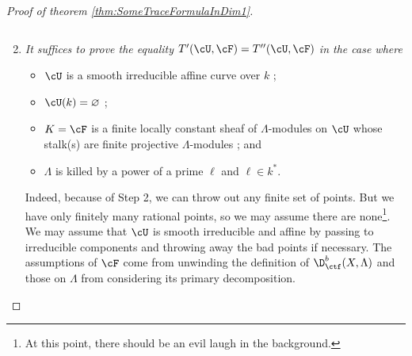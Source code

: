 \begin{proof}[Proof of theorem \ref{thm:SomeTraceFormulaInDim1}]
\begin{enumerate}[\it Step 1.]
$$$$
\item 
{\it It suffices to prove the equality $T'(\cU, \cF) = T''(\cU, \cF)$ in the case where 
\begin{itemize}
\item $\cU$ is a smooth irreducible affine curve over $k$ ;
\item $\cU(k) = \varnothing$ ;
\item $K=\cF$ is a finite locally constant sheaf of $\Lambda$-modules on $\cU$ whose stalk(s) are finite projective $\Lambda$-modules ; and
\item $\Lambda$ is killed by a power of a prime $\ell$ and $\ell \in k^*$. 
\end{itemize}
}
Indeed, because of Step 2, we can throw out any finite set of points. But we have only finitely many rational points, so we may assume there are none\footnote{At this point, there should be an evil laugh in the background.}. We may assume that $\cU$ is smooth irreducible and affine by passing to irreducible components and throwing away the bad points if necessary. The assumptions of $\cF$ come from unwinding the definition of $\D_{\ctf}^b(X, \Lambda)$ and those on $\Lambda$ from considering its primary decomposition.
\end{enumerate}


\end{proof}
